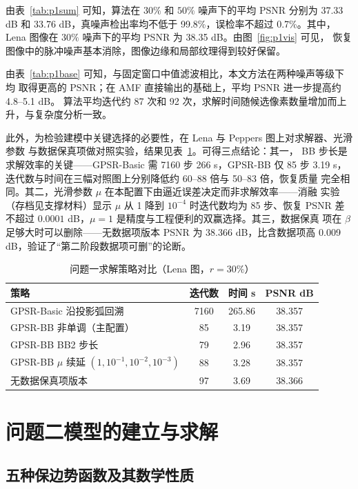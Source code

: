 \documentclass[withoutpreface,bwprint]{cumcmthesis}
\begin{document}
由表~\ref{tab:p1sum} 可知，算法在 $30\%$ 和 $50\%$ 噪声下的平均 PSNR 分别为
37.33 dB 和 33.76 dB，真噪声检出率均不低于 99.8\%，误检率不超过 0.7\%。其中，
Lena 图像在 $30\%$ 噪声下的平均 PSNR 为 38.35 dB。由图~\ref{fig:p1vis} 可见，
恢复图像中的脉冲噪声基本消除，图像边缘和局部纹理得到较好保留。

由表~\ref{tab:p1base} 可知，与固定窗口中值滤波相比，本文方法在两种噪声等级下均
取得更高的 PSNR；在 AMF 直接输出的基础上，平均 PSNR 进一步提高约 4.8--5.1 dB。
算法平均迭代约 87 次和 92 次，求解时间随候选像素数量增加而上升，与复杂度分析一致。

此外，为检验建模中关键选择的必要性，在 Lena 与 Peppers 图上对求解器、光滑参数
与数据保真项做对照实验，结果见表~\ref{tab:p1strategy}。可得三点结论：其一，
BB 步长是求解效率的关键——GPSR-Basic 需 7160 步 266 s，GPSR-BB 仅 85 步
3.19 s，迭代数与时间在三幅对照图上分别降低约 60--88 倍与 50--83 倍，恢复质量
完全相同。其二，光滑参数 $\mu$ 在本配置下由逼近误差决定而非求解效率——消融
实验（存档见支撑材料）显示 $\mu$ 从 1 降到 $10^{-4}$ 时迭代数均为 85 步、恢复
PSNR 差不超过 $0.0001$ dB，$\mu=1$ 是精度与工程便利的双赢选择。其三，数据保真
项在 $\beta$ 足够大时可以删除——无数据项版本 PSNR 为 38.366 dB，比含数据项高
0.009 dB，验证了``第二阶段数据项可删''的论断。

\begin{table}[!htbp]
  \centering\small
  \caption{问题一求解策略对比（Lena 图，$r=30\%$）}
  \label{tab:p1strategy}
  \begin{tabular}{lccc}
    \toprule[1.5pt]
    策略 & 迭代数 & 时间 s & PSNR dB \\
    \midrule[1pt]
    GPSR-Basic 沿投影弧回溯 & 7160 & 265.86 & 38.357 \\
    GPSR-BB 非单调（主配置） & 85 & 3.19 & 38.357 \\
    GPSR-BB BB2 步长 & 79 & 2.96 & 38.357 \\
    GPSR-BB $\mu$ 续延 $(1,10^{-1},10^{-2},10^{-3})$ & 88 & 3.28 & 38.357 \\
    无数据保真项版本 & 97 & 3.69 & 38.366 \\
    \bottomrule[1.5pt]
  \end{tabular}
\end{table}

\section{问题二模型的建立与求解}

\subsection{五种保边势函数及其数学性质}
\end{document}
